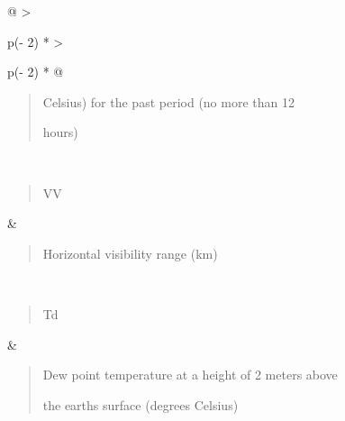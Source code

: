\begin{longtable}[]{@{}
  >{\raggedright\arraybackslash}p{(\columnwidth - 2\tabcolsep) * }
  >{\raggedright\arraybackslash}p{(\columnwidth - 2\tabcolsep) * }@{}}
\begin{minipage}[t]{\linewidth}
\begin{quote}
Celsius) for the past period (no more than 12

hours)
\end{quote}
\end{minipage} \\
\begin{minipage}[t]{\linewidth}\raggedright
\begin{quote}
VV
\end{quote}
\end{minipage} & \begin{minipage}[t]{\linewidth}\raggedright
\begin{quote}
Horizontal visibility range (km)
\end{quote}
\end{minipage} \\
\begin{minipage}[t]{\linewidth}\raggedright
\begin{quote}
Td
\end{quote}
\end{minipage} & \begin{minipage}[t]{\linewidth}\raggedright
\begin{quote}
Dew point temperature at a height of 2 meters above

the earth\textquotesingle s surface (degrees Celsius)
\end{quote}
\end{minipage} \\
\end{longtable}

